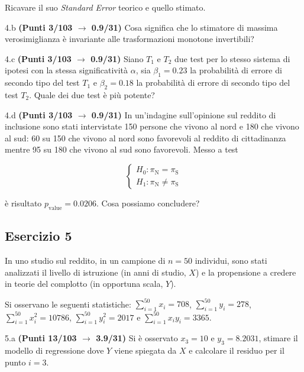 \documentclass[
  11pt,
]{book}
\theoremstyle{mytheoremstyle}
\theoremstyle{mydefstyle}
\begin{document}
Ricavare il suo \emph{Standard Error} teorico e quello stimato.

4.b \textbf{(Punti 3/103 \(\rightarrow\) 0.9/31)} Cosa significa che lo stimatore di massima verosimiglianza è invariante alle trasformazioni monotone invertibili?

4.c \textbf{(Punti 3/103 \(\rightarrow\) 0.9/31)} Siano \(T_1\) e \(T_2\) due test per lo stesso sistema di ipotesi con la stessa significatività \(\alpha\), sia \(\beta_1=0.23\) la probabilità di errore di secondo tipo del test \(T_1\) e \(\beta_2=0.18\) la probabilità di errore di secondo tipo del test \(T_2\). Quale dei due test è più potente?

4.d \textbf{(Punti 3/103 \(\rightarrow\) 0.9/31)} In un'indagine sull'opinione sul reddito di inclusione sono stati intervistate 150 persone che vivono al nord e 180 che vivono al sud: 60 su 150 che vivono al nord sono favorevoli al reddito di cittadinanza mentre 95 su 180 che vivono al sud sono favorevoli.
Messo a test

\[
\begin{cases}
   H_0: \pi_\text{N} = \pi_\text{S} \\
   H_1: \pi_\text{N} \neq \pi_\text{S} 
\end{cases}
\]

è risultato \(p_{\text{value}} =0.0206\). Cosa possiamo concludere?

\subsection{Esercizio 5}\label{esercizio-5-36}

In uno studio sul reddito, in un campione di \(n=50\) individui, sono stati analizzati il livello di istruzione (in anni di studio, \(X\)) e la propensione a credere in teorie del complotto (in opportuna scala, \(Y\)).

Si osservano le seguenti statistiche:
\(\sum_{i=1}^{50}x_i=708\), \(\sum_{i=1}^{50}y_i=278\),
\(\sum_{i=1}^{50}x_i^2=10786\), \(\sum_{i=1}^{50}y_i^2=2017\) e \(\sum_{i=1}^{50}x_iy_i=3365\).

5.a \textbf{(Punti 13/103 \(\rightarrow\) 3.9/31)} Si è osservato \(x_3=10\) e \(y_3=8.2031\), stimare il modello di regressione dove \(Y\) viene spiegata da \(X\) e calcolare il residuo per il punto \(i=3\).
\end{document}
